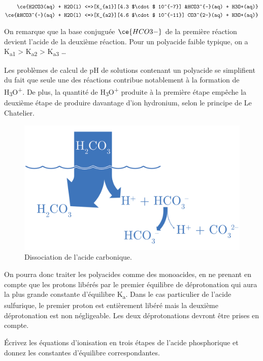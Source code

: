 \documentclass[
  11pt,
  a4paper,
  openany]{book}
\begin{document}
\[
\begin{split}
\ce{H2CO3(aq) + H2O(l) <=>[K_{a1}][4.3 $\cdot$ 10^{-7}] &HCO3^{-}(aq) + H3O+(aq)} \\
\ce{&HCO3^{-}(aq) + H2O(l) <=>[K_{a2}][4.6 $\cdot$ 10^{-11}] CO3^{2-}(aq) + H3O+(aq)}
\end{split}
\]

On remarque que la base conjuguée \(\ce{HCO3-}\) de la première réaction devient l'acide de la deuxième réaction. Pour un polyacide faible typique, on a K\textsubscript{a1} \textgreater{} K\textsubscript{a2} \textgreater{} K\textsubscript{a3} \ldots{}

Les problèmes de calcul de pH de solutions contenant un polyacide se simplifient du fait que seule une des réactions contribue notablement à la formation de H\textsubscript{3}O\textsuperscript{+}. De plus, la quantité de H\textsubscript{3}O\textsuperscript{+} produite à la première étape empêche la deuxième étape de produire davantage d'ion hydronium, selon le principe de Le Chatelier.

\begin{figure}

{\centering \includegraphics[width=0.5\linewidth]{images/acides-faibles-2} 

}

\caption{Dissociation de l'acide carbonique.}\label{fig:acides-faibles-2}
\end{figure}

On pourra donc traiter les polyacides comme des monoacides, en ne prenant en compte que les protons libérés par le premier équilibre de déprotonation qui aura la plus grande constante d'équilibre K\textsubscript{a}. Dans le cas particulier de l'acide sulfurique, le premier proton est entièrement libéré mais la deuxième déprotonation est non négligeable. Les deux déprotonations devront être prises en compte.

\begin{Exercise}
Écrivez les équations d'ionisation en trois étapes de l'acide phosphorique et donnez les constantes d'équilibre correspondantes.

\end{Exercise}
\end{document}

